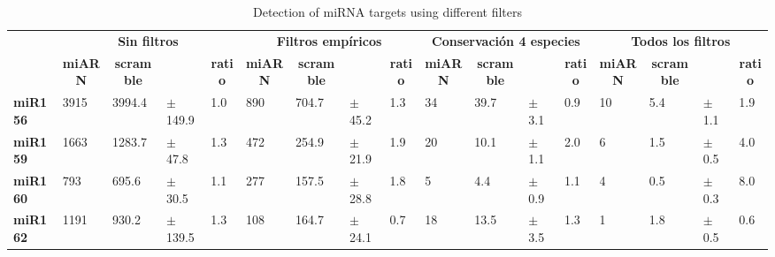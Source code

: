 \begin{landscape}
\begin{table}[]
\scriptsize
\centering
\caption{Detection of miRNA targets using different filters}
\label{table:NAR_table_2}
\begin{tabular}{lllllllllllllllll}
\multicolumn{1}{c}{} & \multicolumn{4}{c}{\textbf{Sin filtros}}                        & \multicolumn{4}{c}{\textbf{Filtros empíricos}}                  & \multicolumn{4}{c}{\textbf{Conservación 4 especies}}            & \multicolumn{4}{c}{\textbf{Todos los filtros}}                  \\
\multicolumn{1}{c}{} & \multicolumn{1}{c}{\textbf{miARN}} & \multicolumn{1}{c}{\textbf{scramble}} & \multicolumn{1}{c}{\textbf{}} & \multicolumn{1}{c}{\textbf{ratio}} & \multicolumn{1}{c}{\textbf{miARN}} & \multicolumn{1}{c}{\textbf{scramble}} & \multicolumn{1}{c}{\textbf{}} & \multicolumn{1}{c}{\textbf{ratio}} & \multicolumn{1}{c}{\textbf{miARN}} & \multicolumn{1}{c}{\textbf{scramble}} & \multicolumn{1}{c}{\textbf{}} & \multicolumn{1}{c}{\textbf{ratio}} & \multicolumn{1}{c}{\textbf{miARN}} & \multicolumn{1}{c}{\textbf{scramble}} & \multicolumn{1}{c}{\textbf{}} & \multicolumn{1}{c}{\textbf{ratio}} \\
\textbf{miR156}      & 3915           & 3994.4            & $\pm$ 149.9     & 1.0            & 890            & 704.7             & $\pm$  45.2      & 1.3            & 34             & 39.7              & $\pm$  3.1       & 0.9            & 10             & 5.4               & $\pm$  1.1       & 1.9            \\
\textbf{miR159}      & 1663           & 1283.7            & $\pm$  47.8      & 1.3            & 472            & 254.9             & $\pm$  21.9      & 1.9            & 20             & 10.1              & $\pm$  1.1       & 2.0            & 6              & 1.5               & $\pm$  0.5       & 4.0            \\
\textbf{miR160}      & 793            & 695.6             & $\pm$  30.5      & 1.1            & 277            & 157.5             & $\pm$  28.8      & 1.8            & 5              & 4.4               & $\pm$  0.9       & 1.1            & 4              & 0.5               & $\pm$  0.3       & 8.0            \\
\textbf{miR162}      & 1191           & 930.2             & $\pm$  139.5     & 1.3            & 108            & 164.7             & $\pm$  24.1      & 0.7            & 18             & 13.5              & $\pm$  3.5       & 1.3            & 1              & 1.8               &  $\pm$ 0.5       & 0.6            \\

\end{tabular}
\end{table}
\end{landscape}
